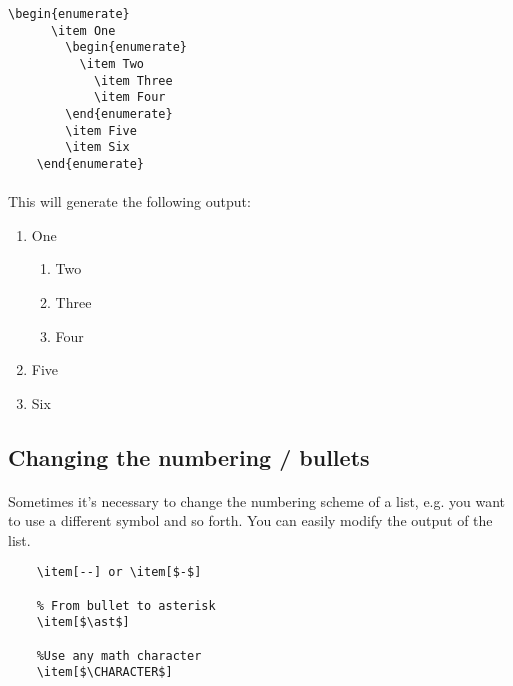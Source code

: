   \begin{lstlisting}[language={[LaTeX]TeX},breaklines=true,frame=single]
    \begin{enumerate}
      \item One
        \begin{enumerate}
          \item Two
            \item Three
            \item Four
        \end{enumerate}
        \item Five
        \item Six
    \end{enumerate}
  \end{lstlisting}

  \paragraph{}
  This will generate the following output:
  \begin{enumerate}
    \item One
      \begin{enumerate}
        \item Two
          \item Three
          \item Four
      \end{enumerate}
      \item Five
      \item Six
  \end{enumerate}

  \subsection{Changing the numbering / bullets}
  \paragraph{}
  Sometimes it's necessary to change the numbering scheme of a list, e.g. you want to use a different symbol and so forth. You can easily modify the output of the list.
  \begin{lstlisting}[language={[LaTeX]TeX},breaklines=true,frame=single]
    %From bullet to dash
    \item[--] or \item[$-$]
    
    % From bullet to asterisk
    \item[$\ast$]
    
    %Use any math character
    \item[$\CHARACTER$]
  \end{lstlisting}
